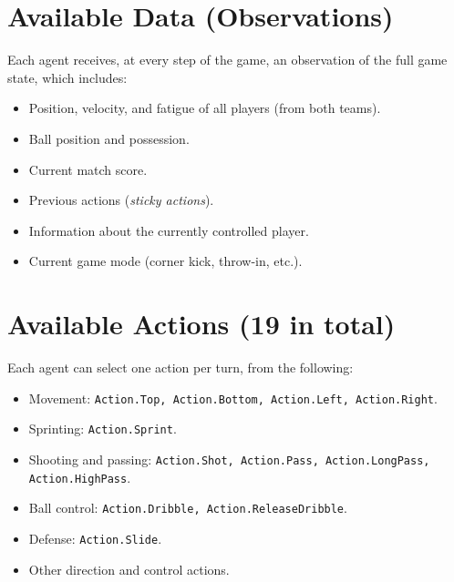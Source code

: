 \documentclass[12pt]{article}
\begin{document}
\section*{Available Data (Observations)}

Each agent receives, at every step of the game, an observation of the full game state, which includes:

\begin{itemize}
    \item Position, velocity, and fatigue of all players (from both teams).
    \item Ball position and possession.
    \item Current match score.
    \item Previous actions (\textit{sticky actions}).
    \item Information about the currently controlled player.
    \item Current game mode (corner kick, throw-in, etc.).
\end{itemize}

\vspace{0.3cm}


\section*{Available Actions (19 in total)}

Each agent can select one action per turn, from the following:

\begin{itemize}
    \item Movement: \texttt{Action.Top, Action.Bottom, Action.Left, Action.Right}.
    \item Sprinting: \texttt{Action.Sprint}.
    \item Shooting and passing: \texttt{Action.Shot, Action.Pass, Action.LongPass, Action.HighPass}.
    \item Ball control: \texttt{Action.Dribble, Action.ReleaseDribble}.
    \item Defense: \texttt{Action.Slide}.
    \item Other direction and control actions.
\end{itemize}
\end{document}

